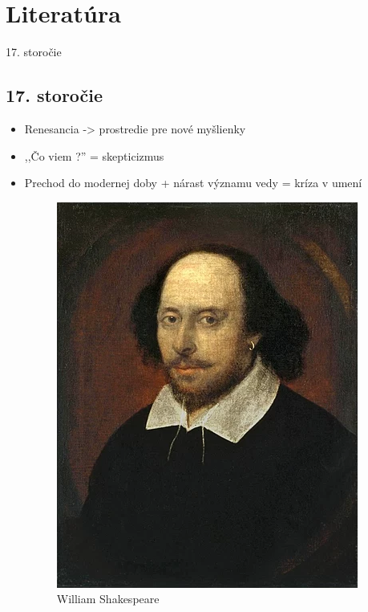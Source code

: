 \documentclass[dvipsnames]{beamer}
\begin{document}
\section{Literatúra}
\frame{\sectionpage}

\begin{frame}{17. storočie}
	\subsection{17. storočie}	
	\begin{itemize}
		\item Renesancia -> prostredie pre nové myšlienky
		\item ,,Čo viem ?'' = skepticizmus
		\item Prechod do modernej doby + nárast významu vedy = kríza v umení
		\begin{minipage}[t]{0.4\textwidth}
		\kern0pt
		
		\begin{figure}
			\includegraphics[scale=0.2]{pivo}
			\caption{William Shakespeare}
		\end{figure}
		\end{minipage}%
		\begin{minipage}[t]{0.6\textwidth}
		\kern0pt


\end{minipage}
\end{itemize}
\end{frame}
\end{document}
